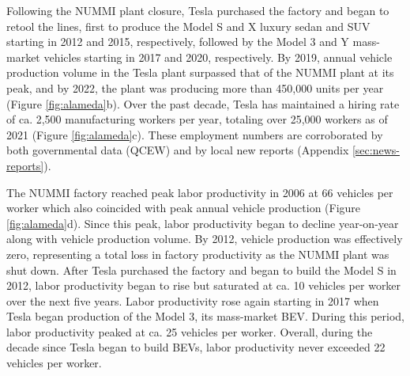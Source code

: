 \documentclass[sn-mathphys,Numbered]{sn-jnl}%
\begin{document}

Following the NUMMI plant closure, Tesla purchased the factory and began to retool the lines, first to produce the Model S and X luxury sedan and SUV starting in 2012 and 2015, respectively, followed by the Model 3 and Y mass-market vehicles starting in 2017 and 2020, respectively. By 2019, annual vehicle production volume in the Tesla plant surpassed that of the NUMMI plant at its peak, and by 2022, the plant was producing more than 450,000 units per year (Figure \ref{fig:alameda}b). Over the past decade, Tesla has maintained a hiring rate of ca. 2,500 manufacturing workers per year, totaling over 25,000 workers as of 2021 (Figure \ref{fig:alameda}c). These employment numbers are corroborated by both governmental data (QCEW) and by local new reports (Appendix \ref{sec:news-reports}).

The NUMMI factory reached peak labor productivity in 2006 at 66 vehicles per worker which also coincided with peak annual vehicle production (Figure \ref{fig:alameda}d). Since this peak, labor productivity began to decline year-on-year along with vehicle production volume. By 2012, vehicle production was effectively zero, representing a total loss in factory productivity as the NUMMI plant was shut down. After Tesla purchased the factory and began to build the Model S in 2012, labor productivity began to rise but saturated at ca. 10 vehicles per worker over the next five years. Labor productivity rose again starting in 2017 when Tesla began production of the Model 3, its mass-market BEV. During this period, labor productivity peaked at ca. 25 vehicles per worker. Overall, during the decade since Tesla began to build BEVs, labor productivity never exceeded 22 vehicles per worker. 
\end{document}
